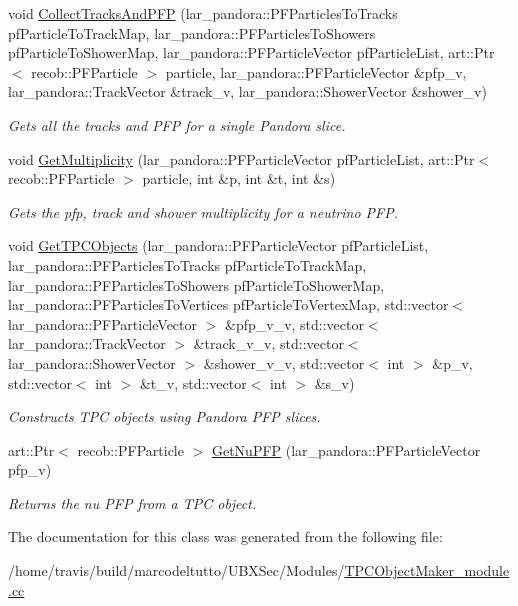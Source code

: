 \begin{DoxyCompactItemize}
\item 
void \hyperlink{group__UBXSec_gafb413d9b6e9949b0048d53244d2f8a0a}{\-Collect\-Tracks\-And\-P\-F\-P} (lar\-\_\-pandora\-::\-P\-F\-Particles\-To\-Tracks pf\-Particle\-To\-Track\-Map, lar\-\_\-pandora\-::\-P\-F\-Particles\-To\-Showers pf\-Particle\-To\-Shower\-Map, lar\-\_\-pandora\-::\-P\-F\-Particle\-Vector pf\-Particle\-List, art\-::\-Ptr$<$ recob\-::\-P\-F\-Particle $>$ particle, lar\-\_\-pandora\-::\-P\-F\-Particle\-Vector \&pfp\-\_\-v, lar\-\_\-pandora\-::\-Track\-Vector \&track\-\_\-v, lar\-\_\-pandora\-::\-Shower\-Vector \&shower\-\_\-v)
\begin{DoxyCompactList}\small\item\em \-Gets all the tracks and \-P\-F\-P for a single \-Pandora slice. \end{DoxyCompactList}\item 
void \hyperlink{group__UBXSec_ga73815b97ad47030b3b73bc623d583fef}{\-Get\-Multiplicity} (lar\-\_\-pandora\-::\-P\-F\-Particle\-Vector pf\-Particle\-List, art\-::\-Ptr$<$ recob\-::\-P\-F\-Particle $>$ particle, int \&p, int \&t, int \&s)
\begin{DoxyCompactList}\small\item\em \-Gets the pfp, track and shower multiplicity for a neutrino \-P\-F\-P. \end{DoxyCompactList}\item 
void \hyperlink{group__UBXSec_gab15442d6254937d3930ea046a93321b9}{\-Get\-T\-P\-C\-Objects} (lar\-\_\-pandora\-::\-P\-F\-Particle\-Vector pf\-Particle\-List, lar\-\_\-pandora\-::\-P\-F\-Particles\-To\-Tracks pf\-Particle\-To\-Track\-Map, lar\-\_\-pandora\-::\-P\-F\-Particles\-To\-Showers pf\-Particle\-To\-Shower\-Map, lar\-\_\-pandora\-::\-P\-F\-Particles\-To\-Vertices pf\-Particle\-To\-Vertex\-Map, std\-::vector$<$ lar\-\_\-pandora\-::\-P\-F\-Particle\-Vector $>$ \&pfp\-\_\-v\-\_\-v, std\-::vector$<$ lar\-\_\-pandora\-::\-Track\-Vector $>$ \&track\-\_\-v\-\_\-v, std\-::vector$<$ lar\-\_\-pandora\-::\-Shower\-Vector $>$ \&shower\-\_\-v\-\_\-v, std\-::vector$<$ int $>$ \&p\-\_\-v, std\-::vector$<$ int $>$ \&t\-\_\-v, std\-::vector$<$ int $>$ \&s\-\_\-v)
\begin{DoxyCompactList}\small\item\em \-Constructs \-T\-P\-C objects using \-Pandora \-P\-F\-P slices. \end{DoxyCompactList}\item 
art\-::\-Ptr$<$ recob\-::\-P\-F\-Particle $>$ \hyperlink{group__UBXSec_ga6a47470b5f5690a3626e14bc9f6f360c}{\-Get\-Nu\-P\-F\-P} (lar\-\_\-pandora\-::\-P\-F\-Particle\-Vector pfp\-\_\-v)
\begin{DoxyCompactList}\small\item\em \-Returns the nu \-P\-F\-P from a \-T\-P\-C object. \end{DoxyCompactList}\end{DoxyCompactItemize}


\-The documentation for this class was generated from the following file\-:\begin{DoxyCompactItemize}
\item 
/home/travis/build/marcodeltutto/\-U\-B\-X\-Sec/\-Modules/\hyperlink{TPCObjectMaker__module_8cc}{\-T\-P\-C\-Object\-Maker\-\_\-module.\-cc}\end{DoxyCompactItemize}

